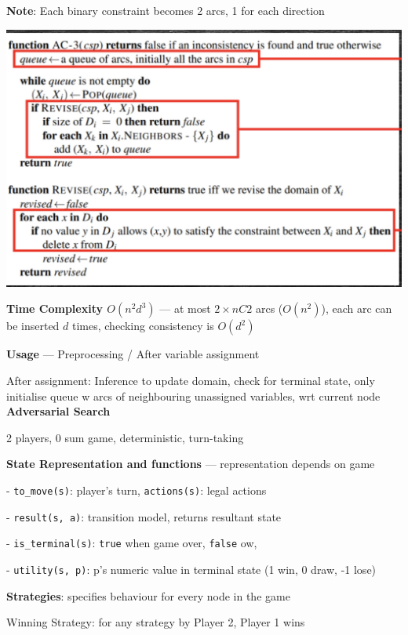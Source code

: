 \documentclass[10pt, a4paper]{article}
\newcommand{\highlight}[1]{{\color{red}\textbf{#1}}}
\newcommand{\red}[1]{{\color{red}#1}}
\newcommand{\green}[1]{{\color{PineGreen}#1}}
\newcommand{\header}[1]{{\normalsize\textbf{#1}}}
\begin{document}
\begin{multicols*}{3}
		\highlight{Note}: Each binary constraint becomes 2 arcs, 1 for each direction

		\includegraphics*[scale=.14]{./assets/AC3.jpeg}

		\textbf{Time Complexity $O(n^2d^3)$} --- at most $2 \times nC2$ arcs ($O(n^2)$), each arc can be inserted $d$ times, checking consistency is $O(d^2)$

		\textbf{Usage} --- Preprocessing / After variable assignment 
		
		After assignment: Inference to update domain, check for terminal state, only initialise queue w arcs of \red{neighbouring unassigned variables}, wrt current node\\
		
		\header{Adversarial Search}

		\red{2} players,  \red{0 sum} game, \green{deterministic}, \green{turn-taking}

		\textbf{State Representation and functions} --- representation depends on game

		- \texttt{to\_move(s)}: player's turn, \texttt{actions(s)}: legal actions
		
		- \texttt{result(s, a)}: transition model, returns resultant state 
		
		- \texttt{is\_terminal(s)}: \texttt{true} when game over, \texttt{false} ow, 
		
		- \texttt{utility(s, p)}: p's \red{numeric} value in \red{terminal} state (1 win, 0 draw, -1 lose)

		\textbf{Strategies}: specifies behaviour for every node in the game

		Winning Strategy: for any strategy by Player 2, Player 1 wins


\end{multicols*}
\end{document}

